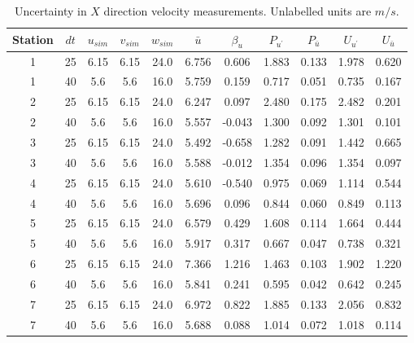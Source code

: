 \renewcommand\baselinestretch{1.3}\selectfont
\begin{table}[H]
\begin{center}
\begin{tabular}{|ccccccccccc|}
	\hline
	Station & $dt$ & $u_{sim}$ & $v_{sim}$ & $w_{sim}$ & $\bar{u}$ & $\beta_u$ & $P_{u^{\prime}}$ & $P_{\bar{u}}$ & $U_{u^{\prime}}$ & $U_{\bar{u}}$\\
	\hline
	1 & 25 & 6.15 & 6.15 & 24.0 & 6.756 & 0.606 & 1.883 & 0.133 & 1.978 & 0.620\\
	1 & 40 & 5.6 & 5.6 & 16.0 & 5.759 & 0.159 & 0.717 & 0.051 & 0.735 & 0.167\\
	2 & 25 & 6.15 & 6.15 & 24.0 & 6.247 & 0.097 & 2.480 & 0.175 & 2.482 & 0.201\\
	2 & 40 & 5.6 & 5.6 & 16.0 & 5.557 & -0.043 & 1.300 & 0.092 & 1.301 & 0.101\\
	3 & 25 & 6.15 & 6.15 & 24.0 & 5.492 & -0.658 & 1.282 & 0.091 & 1.442 & 0.665\\
	3 & 40 & 5.6 & 5.6 & 16.0 & 5.588 & -0.012 & 1.354 & 0.096 & 1.354 & 0.097\\
	4 & 25 & 6.15 & 6.15 & 24.0 & 5.610 & -0.540 & 0.975 & 0.069 & 1.114 & 0.544\\
	4 & 40 & 5.6 & 5.6 & 16.0 & 5.696 & 0.096 & 0.844 & 0.060 & 0.849 & 0.113\\
	5 & 25 & 6.15 & 6.15 & 24.0 & 6.579 & 0.429 & 1.608 & 0.114 & 1.664 & 0.444\\
	5 & 40 & 5.6 & 5.6 & 16.0 & 5.917 & 0.317 & 0.667 & 0.047 & 0.738 & 0.321\\
	6 & 25 & 6.15 & 6.15 & 24.0 & 7.366 & 1.216 & 1.463 & 0.103 & 1.902 & 1.220\\
	6 & 40 & 5.6 & 5.6 & 16.0 & 5.841 & 0.241 & 0.595 & 0.042 & 0.642 & 0.245\\
	7 & 25 & 6.15 & 6.15 & 24.0 & 6.972 & 0.822 & 1.885 & 0.133 & 2.056 & 0.832\\
	7 & 40 & 5.6 & 5.6 & 16.0 & 5.688 & 0.088 & 1.014 & 0.072 & 1.018 & 0.114\\
	\hline
\end{tabular}
\caption{Uncertainty in $X$ direction velocity measurements. Unlabelled units are $m/s$.}
\label{table:uncertainties_u}
\end{center}
\end{table}
\renewcommand\baselinestretch{2}\selectfont
